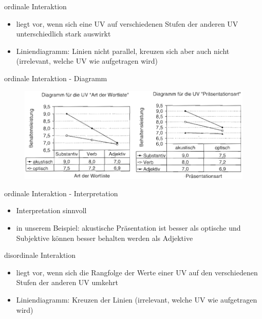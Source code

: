 \documentclass{beamer}
\begin{document}
	\begin{frame}{ordinale Interaktion}
		\begin{itemize}
			\item liegt vor, wenn sich eine UV auf verschiedenen Stufen der anderen UV unterschiedlich stark auswirkt 
			\item Liniendiagramm: Linien nicht parallel, kreuzen sich aber auch nicht (irrelevant, welche UV wie aufgetragen wird) 
		\end{itemize}
	\end{frame}
	
	\begin{frame}{ordinale Interaktion - Diagramm}
		\begin{figure}
			\centering
			\includegraphics[width=1.0\textwidth]{Bilder/ordinaleI.png}
		\end{figure}
	\end{frame}
	
	\begin{frame}{ordinale Interaktion - Interpretation}
		\begin{itemize}
			\item Interpretation sinnvoll
			\item in unserem Beispiel: akustische Präsentation ist besser als optische und Subjektive können besser behalten werden als Adjektive
		\end{itemize}
	\end{frame}
	
	\begin{frame}{disordinale Interaktion}
		\begin{itemize}
			\item liegt vor, wenn sich die Rangfolge der Werte einer UV auf den verschiedenen Stufen der anderen UV umkehrt
			\item Liniendiagramm: Kreuzen der Linien (irrelevant, welche UV wie aufgetragen wird)
		\end{itemize}
	\end{frame}
	
\end{document}
